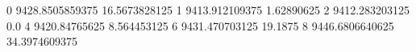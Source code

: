 0 9428.8505859375 16.5673828125
1 9413.912109375 1.62890625
2 9412.283203125 0.0
4 9420.84765625 8.564453125
6 9431.470703125 19.1875
8 9446.6806640625 34.3974609375
